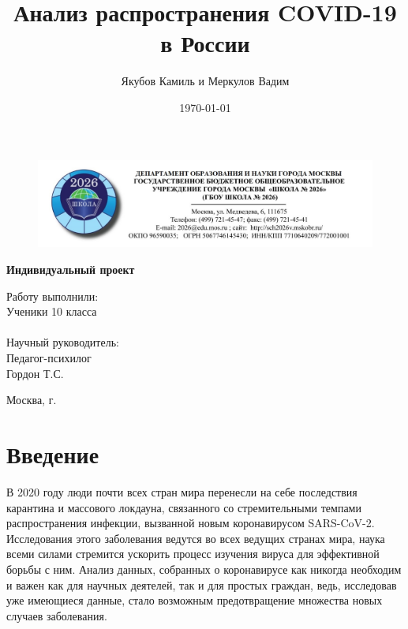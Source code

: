 \documentclass[a4paper, 12pt]{extarticle}
\title{Анализ распространения COVID-19 в России}
\author{Якубов Камиль и Меркулов Вадим}
\date{\today}
\begin{document}
\begin{titlepage}
    \vspace*{0.7cm}
    \begin{center}
        \begin{figure}[h]
            \includegraphics{../plots/title_page_school_logo.jpg}
        \end{figure}
        \vspace{1.5cm}

        \Large{\textbf{
            Индивидуальный проект \\
            \textquote{\thetitle}}
        }
    \end{center}
    \vspace{5cm}

    \begin{flushright}
        Работу выполнили:\\ \vspace{7pt}
        Ученики 10  класса\\ \vspace{7pt}
        \theauthor\\ \vspace{1cm}
        Научный руководитель:\\ \vspace{7pt}
        Педагог-психилог\\ \vspace{7pt}
        Гордон Т.С.
    \end{flushright}
    \vfill
    \centering
    Москва, {\the\year} г.

\end{titlepage}

\tableofcontents
\newpage

\section{Введение}

В 2020 году люди почти всех стран мира перенесли на себе последствия карантина и массового локдауна, связанного со стремительными темпами распространения инфекции, вызванной новым коронавирусом SARS-CoV-2. Исследования этого заболевания ведутся во всех ведущих странах мира, наука всеми силами стремится ускорить процесс изучения вируса для эффективной борьбы с ним. Анализ данных, собранных о коронавирусе как никогда необходим и важен как для научных деятелей, так и для простых граждан, ведь, исследовав уже имеющиеся данные, стало возможным предотвращение множества новых случаев заболевания.
\\
\end{document}
